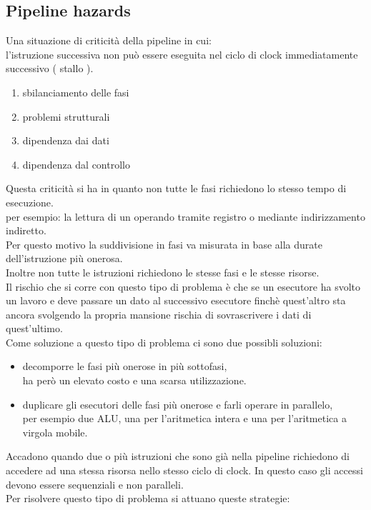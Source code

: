 \documentclass[arch.tex]{subfiles}
\begin{document}
\subsection{Pipeline hazards}%
\label{sub:pipeline_hazards}

Una situazione di criticità della pipeline in cui:\\
l'istruzione successiva non può essere eseguita nel ciclo di clock 
immediatamente successivo ( stallo ).

\begin{enumerate}
	\item sbilanciamento delle fasi
	\item problemi strutturali
	\item dipendenza dai dati
	\item dipendenza dal controllo
\end{enumerate}

%
\label{par:sbilanciamento_delle_fasi}
Questa criticità si ha in quanto non tutte le fasi richiedono lo stesso tempo
di esecuzione.\\
per esempio: la lettura di un operando tramite registro o mediante indirizzamento
indiretto.\\
Per questo motivo la suddivisione in fasi va misurata in base alla durate 
dell'istruzione più onerosa.\\
Inoltre non tutte le istruzioni richiedono le stesse  fasi e le stesse risorse.\\
Il rischio che si corre con questo tipo di problema è che se un esecutore ha svolto
un lavoro e deve passare un dato al successivo esecutore finchè quest'altro
sta ancora svolgendo la propria mansione rischia di sovrascrivere i dati 
di quest'ultimo.\\
Come soluzione a questo tipo di problema ci sono due possibli soluzioni:

\begin{itemize}
	\item decomporre le fasi più onerose in più sottofasi,\\
		ha però un elevato costo e una scarsa utilizzazione.
	\item duplicare gli esecutori delle fasi più onerose e farli operare in 
		parallelo,\\
		per esempio due ALU, una per l'aritmetica intera e una per
		l'aritmetica a virgola mobile.
\end{itemize}

%
\label{par:problemi_strutturali}
Accadono quando due o più istruzioni che sono già nella pipeline richiedono di 
accedere ad una stessa risorsa nello stesso ciclo di clock. In questo caso 
gli accessi devono essere sequenziali e non paralleli.\\
Per risolvere questo tipo di problema si attuano queste strategie:
\end{document}

